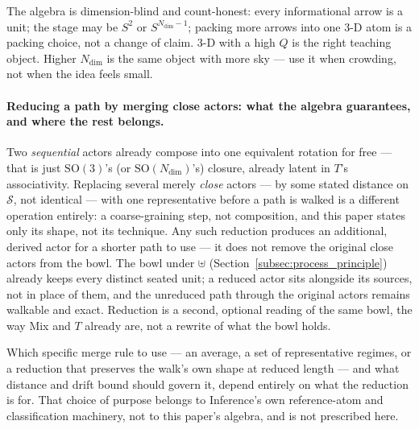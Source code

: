 \documentclass[12pt, a4paper]{article}
\begin{document}
The algebra is dimension-blind and count-honest: every informational
arrow is a unit; the stage may be $S^2$ or $S^{N_{\mathrm{dim}}-1}$;
packing more arrows into one 3-D atom is a packing choice, not a
change of claim. 3-D with a high $Q$ is the right teaching object.
Higher $N_{\mathrm{dim}}$ is the same object with more sky --- use it
when crowding, not when the idea feels small.


\paragraph{Reducing a path by merging close actors: what the algebra
guarantees, and where the rest belongs.} Two \emph{sequential} actors
already compose into one equivalent rotation for free --- that is
just $\mathrm{SO}(3)$'s (or $\mathrm{SO}(N_{\mathrm{dim}})$'s) closure,
already latent in $T$'s associativity. Replacing several merely
\emph{close} actors --- by some stated distance on $\mathcal{S}$, not
identical --- with one representative before a path is walked is a
different operation entirely: a coarse-graining step, not
composition, and this paper states only its shape, not its
technique. Any such reduction produces an additional, derived actor
for a shorter path to use --- it does not remove the original close
actors from the bowl. The bowl under $\uplus$
(Section~\ref{subsec:process_principle}) already keeps every
distinct seated unit; a reduced actor sits alongside its sources, not
in place of them, and the unreduced path through the original actors
remains walkable and exact. Reduction is a second, optional reading
of the same bowl, the way Mix and $T$ already are, not a rewrite of
what the bowl holds.

Which specific merge rule to use --- an average, a set of
representative regimes, or a reduction that preserves the walk's own
shape at reduced length --- and what distance and drift bound should
govern it, depend entirely on what the reduction is for. That choice
of purpose belongs to Inference's own reference-atom and
classification machinery, not to this paper's algebra, and is not
prescribed here.
\end{document}
